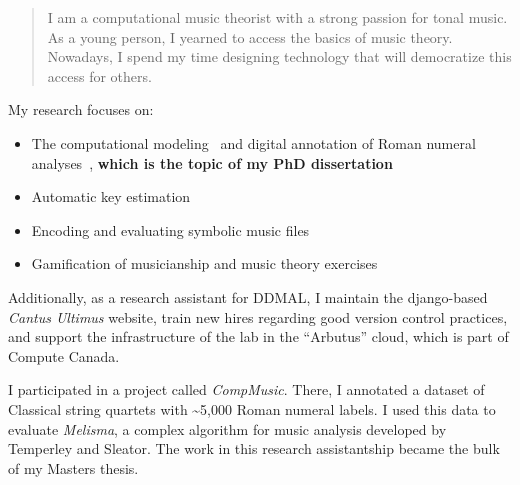 \documentclass[10pt,a4paper,ragged2e,withhyper]{altacv}
\begin{document}
\begin{paracol}{2}

\begin{quote}
I am a computational music theorist with a strong passion for tonal music.
As a young person, I yearned to access the basics of music theory.
Nowadays, I spend my time designing technology that will democratize this access for others.
\end{quote}


My research focuses on:
\begin{itemize}
    \item The computational modeling~\parencite{napoles_lopez_augmentednet_2021} and digital annotation of Roman numeral analyses~\parencite{napoles_lopez_harmalysis_2020}, \textbf{which is the topic of my PhD dissertation}
    \item Automatic key estimation \cite{napoles_lopez_key-finding_2019, napoles_lopez_local_2020}
    \item Encoding and evaluating symbolic music files \parencite{degroot-maggetti_data_2020, napoles_lopez_harmonic_2020, napoles_lopez_encoding_2018, napoles_lopez_effects_2019}
    \item Gamification of musicianship and music theory exercises \parencite{napoles_lopez_-re-myth_2020, napoles_lopez_dandelot_2019}
\end{itemize}

Additionally, as a research assistant for DDMAL, I maintain the django-based \emph{Cantus Ultimus} website, train new hires regarding good version control practices, and support the infrastructure of the lab in the ``Arbutus'' cloud, which is part of Compute Canada.

\medskip

I participated in a project called \emph{CompMusic}.
There, I annotated a dataset of Classical string quartets with \textasciitilde{}5,000 Roman numeral labels. 
I used this data to evaluate \emph{Melisma}, a complex algorithm for music analysis developed by Temperley and Sleator.
The work in this research assistantship became the bulk of my Masters thesis.


\end{paracol}
\end{document}
